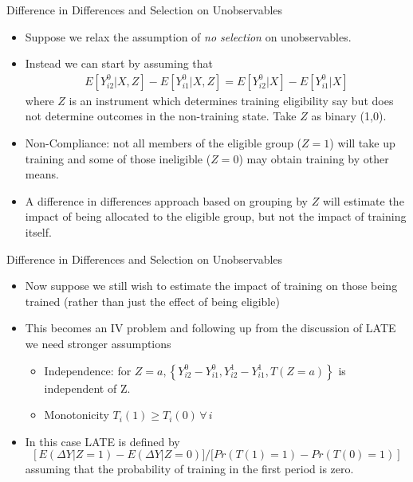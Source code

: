 \begin{frame}{Difference in Differences and Selection on Unobservables}
\begin{itemize}
\item Suppose we relax the assumption of \emph{no selection} on unobservables. 
\item Instead we can start by assuming that
\begin{align*}
E[Y_{i2}^0 | X,Z] - E[Y_{i1}^0 | X,Z] = E[Y_{i2}^0 | X] - E[Y_{i1}^0 | X]
\end{align*} 
where $Z$ is an instrument which determines training eligibility say but does not determine outcomes in the non-training state. Take $Z$ as binary (1,0).
\item Non-Compliance: not all members of the eligible group ($Z = 1$) will take up training and some of those ineligible ($Z = 0$) may obtain training by other means.
\item A difference in differences approach based on grouping by $Z$ will estimate the impact of being allocated to the eligible group, but not the impact of training itself.
\end{itemize}
\end{frame}

\begin{frame}{Difference in Differences and Selection on Unobservables}
\begin{itemize}
\item Now suppose we still wish to estimate the impact of training on those being trained (rather than just the effect of being eligible)
\item This becomes an IV problem and following up from the discussion of LATE we need stronger assumptions
\begin{itemize}
\item  Independence: for $Z = a, \left\{Y_{i2}^0 - Y_{i1}^0, Y_{i2}^1 - Y_{i1}^1, T(Z=a)\right\}$ is independent of Z.
\item Monotonicity $T_i(1) \ge T_i(0) \, \forall \, i$
\end{itemize}
\item In this case LATE is defined by
 $$\left [E(\Delta Y | Z = 1) - E(\Delta Y | Z = 0)] / [Pr(T(1) = 1) - Pr(T(0) = 1) \right]$$
assuming that the probability of training in the first period is zero.
\end{itemize}              
\end{frame}



